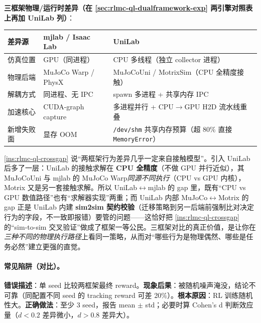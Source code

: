 \textbf{三框架物理/运行时差异（在 \cref{sec:rlmc-ql-dualframework-exp} 两引擎对照表上再加 UniLab 列）}：

\begin{center}
\small
\begin{tabular}{@{}lp{4.0cm}p{4.0cm}@{}}
\toprule
差异源 & mjlab / Isaac Lab & UniLab \\
\midrule
仿真位置 & GPU（同进程） & CPU 多线程（独立 collector 进程） \\
物理后端 & MuJoCo Warp / PhysX & MuJoCoUni / MotrixSim（CPU 全精度接触） \\
解耦方式 & 同进程、无 IPC & spawn 多进程 + 共享内存 IPC \\
加速核心 & CUDA-graph capture & 多进程并行 + CPU$\to$GPU H2D 流水线重叠 \\
新增失败面 & 显存 OOM & \verb|/dev/shm| 共享内存预算（超 80\% 直接 \verb|MemoryError|） \\
\bottomrule
\end{tabular}
\end{center}

\begin{insight}\label{ins:rlmc-ql-cputhird}
\cref{ins:rlmc-ql-crossgap} 说“两框架行为差异几乎一定来自接触模型”。引入 UniLab 后多了一层：UniLab 的接触求解在 \textbf{CPU 全精度}（不做 GPU 并行近似），其 MuJoCoUni 与 mjlab 的 MuJoCo Warp\emph{同源不同执行}（CPU vs GPU 内核），Motrix 又是另一套接触求解。所以 UniLab$\leftrightarrow$mjlab 的 gap 里，既有“CPU vs GPU 数值路径”也有“求解器实现”两重；而 UniLab 内部 MuJoCo$\leftrightarrow$Motrix 的 gap 正是 UniLab 内建 \textbf{sim2sim 契约校验}（迁移策略到另一后端前强制比对决定行为的字段，不一致即报错）要管的问题——这恰好把 \cref{ins:rlmc-ql-crossgap} 的“sim-to-sim 交叉验证”做成了框架一等公民。三框架对比的真正价值，是让你在\emph{三种不同的物理执行路径}上看同一策略，从而对“哪些行为是物理偶然、哪些是任务必然”建立更强的直觉。
\end{insight}

\paragraph{常见陷阱（对比）。}

\begin{pitfall}[只用 1 个 seed 对比]
\textbf{错误描述}：单 seed 比较两框架最终 reward。\textbf{现象后果}：被随机噪声淹没，结论不可靠（同配置不同 seed 的 tracking reward 可差 20\%）。\textbf{根本原因}：RL 训练随机性大。\textbf{正确做法}：至少 3 seed，报告 mean $\pm$ std；必要时算 Cohen's d 判断效应量（$d<0.2$ 差异微小，$d>0.8$ 差异大）。
\end{pitfall}

